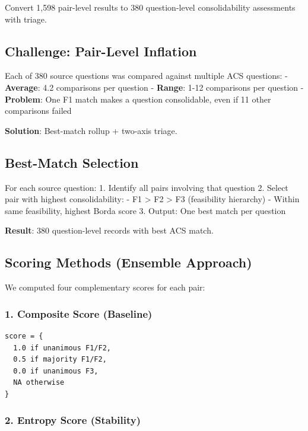 \documentclass[
  letterpaper,
]{report}
\begin{document}
Convert 1,598 pair-level results to 380 question-level consolidability
assessments with triage.

\subsection{Challenge: Pair-Level
Inflation}\label{challenge-pair-level-inflation}

Each of 380 source questions was compared against multiple ACS
questions: - \textbf{Average}: 4.2 comparisons per question -
\textbf{Range}: 1-12 comparisons per question - \textbf{Problem}: One F1
match makes a question consolidable, even if 11 other comparisons failed

\textbf{Solution}: Best-match rollup + two-axis triage.

\subsection{Best-Match Selection}\label{best-match-selection}

For each source question: 1. Identify all pairs involving that question
2. Select pair with highest consolidability: - F1 \textgreater{} F2
\textgreater{} F3 (feasibility hierarchy) - Within same feasibility,
highest Borda score 3. Output: One best match per question

\textbf{Result}: 380 question-level records with best ACS match.

\subsection{Scoring Methods (Ensemble
Approach)}\label{scoring-methods-ensemble-approach}

We computed four complementary scores for each pair:

\subsubsection{1. Composite Score
(Baseline)}\label{composite-score-baseline}

\begin{verbatim}
score = {
  1.0 if unanimous F1/F2,
  0.5 if majority F1/F2,
  0.0 if unanimous F3,
  NA otherwise
}
\end{verbatim}

\subsubsection{2. Entropy Score
(Stability)}\label{entropy-score-stability}
\end{document}
